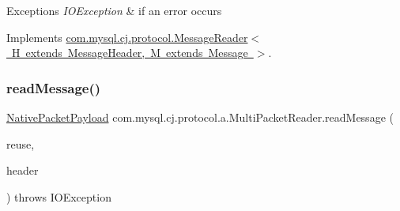 \begin{DoxyExceptions}{Exceptions}
{\em I\+O\+Exception} & if an error occurs \\
\hline
\end{DoxyExceptions}


Implements \mbox{\hyperlink{interfacecom_1_1mysql_1_1cj_1_1protocol_1_1_message_reader_a09745b0e30f74fa13e2b32f22ce70cbb}{com.\+mysql.\+cj.\+protocol.\+Message\+Reader$<$ H extends Message\+Header, M extends Message $>$}}.

\mbox{\label{classcom_1_1mysql_1_1cj_1_1protocol_1_1a_1_1_multi_packet_reader_a8a2162a4cec91c1cd468b3e00bed871f}} 
\subsubsection{\texorpdfstring{read\+Message()}{readMessage()}}
{\footnotesize\ttfamily \mbox{\hyperlink{classcom_1_1mysql_1_1cj_1_1protocol_1_1a_1_1_native_packet_payload}{Native\+Packet\+Payload}} com.\+mysql.\+cj.\+protocol.\+a.\+Multi\+Packet\+Reader.\+read\+Message (\begin{DoxyParamCaption}\item[{Optional$<$ \mbox{\hyperlink{classcom_1_1mysql_1_1cj_1_1protocol_1_1a_1_1_native_packet_payload}{Native\+Packet\+Payload}} $>$}]{reuse,  }\item[{\mbox{\hyperlink{classcom_1_1mysql_1_1cj_1_1protocol_1_1a_1_1_native_packet_header}{Native\+Packet\+Header}}}]{header }\end{DoxyParamCaption}) throws I\+O\+Exception}

\mbox{\label{classcom_1_1mysql_1_1cj_1_1protocol_1_1a_1_1_multi_packet_reader_ac0fa7a5f40fc65548bdb17241152b81c}} 
